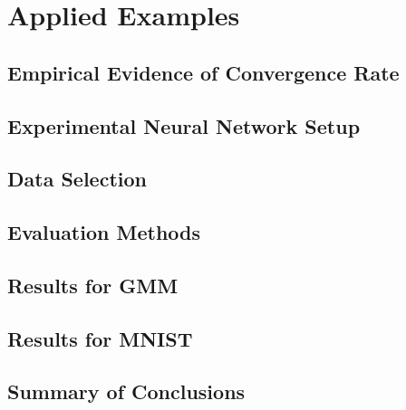 
%
\chapter{Applied Examples}
	
 \section{Empirical Evidence of Convergence Rate}
	 
 \section{Experimental Neural Network Setup}
	
 \section{Data Selection}
 	
 \section{Evaluation Methods}
 	
 \section{Results for GMM}
 	
 \section{Results for MNIST}
 	
 \section{Summary of Conclusions}
 	
%